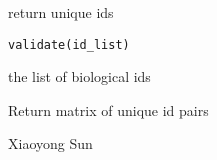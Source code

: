 \begin{Description}\relax
return unique ids
\end{Description}
\begin{Usage}
\begin{verbatim}
validate(id_list)
\end{verbatim}
\end{Usage}
\begin{Arguments}
\begin{ldescription}
\item[\code{id\_list}] the list of biological ids
\end{ldescription}
\end{Arguments}
\begin{Value}
Return matrix of unique id pairs
\end{Value}
\begin{Author}\relax
Xiaoyong Sun
\end{Author}

